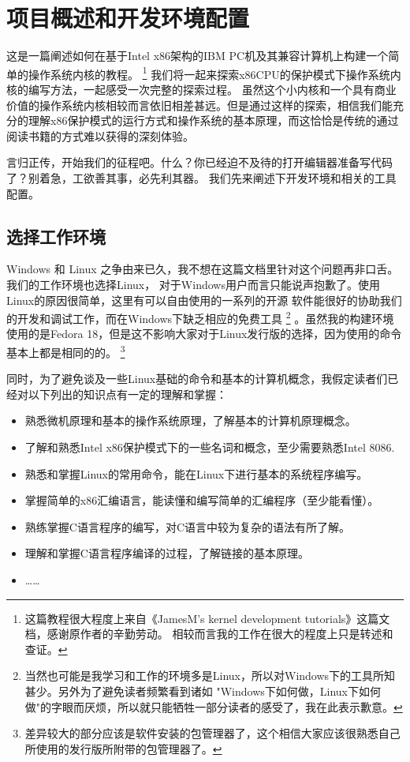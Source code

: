 
\section{项目概述和开发环境配置}

\par 这是一篇阐述如何在基于Intel x86架构的IBM PC机及其兼容计算机上构建一个简单的操作系统内核的教程。\allowbreak
\footnote{这篇教程很大程度上来自《JamesM's kernel development tutorials》这篇文档，感谢原作者的辛勤劳动。\allowbreak
相较而言我的工作在很大的程度上只是转述和查证。}
我们将一起来探索x86CPU的保护模式下操作系统内核的编写方法，一起感受一次完整的探索过程。\allowbreak
虽然这个小内核和一个具有商业价值的操作系统内核相较而言依旧相差甚远。但是通过这样的探索，相信我们能充\allowbreak
分的理解x86保护模式的运行方式和操作系统的基本原理，而这恰恰是传统的通过阅读书籍的方式难以获得的深刻体验。

\par 言归正传，开始我们的征程吧。什么？你已经迫不及待的打开编辑器准备写代码了？别着急，工欲善其事，必先利其器。\allowbreak
我们先来阐述下开发环境和相关的工具配置。

\subsection{选择工作环境}
\par Windows 和 Linux 之争由来已久，我不想在这篇文档里针对这个问题再非口舌。我们的工作环境也选择Linux，\allowbreak
对于Windows用户而言只能说声抱歉了。使用Linux的原因很简单，这里有可以自由使用的一系列的开源\allowbreak
软件能很好的协助我们的开发和调试工作，而在Windows下缺乏相应的免费工具\allowbreak
\footnote {当然也可能是我学习和工作的环境多是Linux，所以对Windows下的工具所知甚少。另外为了避免读者频繁看到诸如\allowbreak
"Windows下如何做，Linux下如何做"的字眼而厌烦，所以就只能牺牲一部分读者的感受了，我在此表示歉意。}
。虽然我的构建环境使用的是Fedora 18，但是这不影响大家对于Linux发行版的选择，因为使用的命令基本上都是相同的的。\allowbreak
\footnote {差异较大的部分应该是软件安装的包管理器了，这个相信大家应该很熟悉自己所使用的发行版所附带的包管理器了。}

\par 同时，为了避免谈及一些Linux基础的命令和基本的计算机概念，我假定读者们已经对以下列出的知识点有一定的理解和掌握：
\begin{itemize}
	\item 熟悉微机原理和基本的操作系统原理，了解基本的计算机原理概念。
	\item 了解和熟悉Intel x86保护模式下的一些名词和概念，至少需要熟悉Intel 8086.
	\item 熟悉和掌握Linux的常用命令，能在Linux下进行基本的系统程序编写。
	\item 掌握简单的x86汇编语言，能读懂和编写简单的汇编程序（至少能看懂）。
	\item 熟练掌握C语言程序的编写，对C语言中较为复杂的语法有所了解。
	\item 理解和掌握C语言程序编译的过程，了解链接的基本原理。
	\item ……
\end{itemize}

